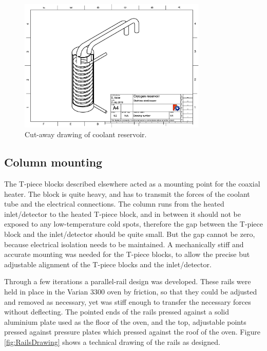 \begin{figure}
	\centering
	\includegraphics[angle=90, origin=c, width=0.8\textwidth]{./Figures/CryogenReservoir.pdf}
	\decoRule
	\caption[Coolant reservoir]{Cut-away drawing of coolant reservoir.}	
	\label{fig:CryogenReservoir}
\end{figure}


\subsection{Column mounting}

The T-piece blocks described elsewhere acted as a mounting point for the coaxial heater. The block is
quite heavy, and has to transmit the forces of the coolant tube and the
electrical connections. The column runs from the heated inlet/detector to the
heated T-piece block, and in between it should not be exposed to any
low-temperature cold spots, therefore the gap between the T-piece block and the
inlet/detector should be quite small. But the gap cannot be zero, because
electrical isolation needs to be maintained. A mechanically stiff and accurate
mounting was needed for the T-piece blocks, to allow the precise but
adjustable alignment of the T-piece blocks and the inlet/detector.

Through a few iterations a parallel-rail design was developed. These rails were
held in place in the Varian 3300 oven by friction, so that they could be
adjusted and removed as necessary, yet was stiff enough to transfer the
necessary forces without deflecting. The pointed ends of
the rails pressed against a solid aluminium plate used as the floor of the oven,
and the top, adjustable points pressed against pressure plates which pressed
against the roof of the oven. Figure \ref{fig:RailsDrawing} shows a
technical drawing of the rails as designed. 

